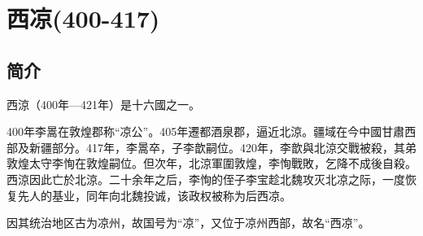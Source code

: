 

\section{西凉\tiny(400-417)}

\subsection{简介}

西涼（400年—421年）是十六國之一。

400年李暠在敦煌郡称“凉公”。405年遷都酒泉郡，逼近北涼。疆域在今中國甘肅西部及新疆部分。417年，李暠卒，子李歆嗣位。420年，李歆與北涼交戰被殺，其弟敦煌太守李恂在敦煌嗣位。但次年，北涼軍圍敦煌，李恂戰敗，乞降不成後自殺。西涼因此亡於北涼。二十余年之后，李恂的侄子李宝趁北魏攻灭北凉之际，一度恢复先人的基业，同年向北魏投诚，该政权被称为后西凉。

因其统治地区古为凉州，故国号为“凉”，又位于凉州西部，故名“西凉”。





